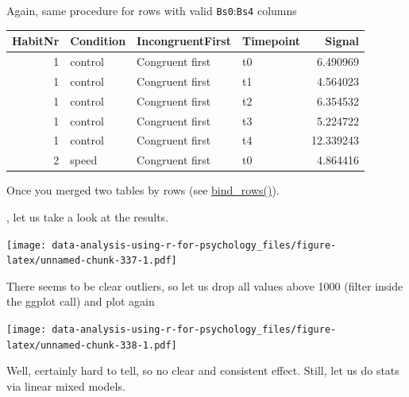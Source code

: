 \documentclass[
]{book}
\begin{document}
Again, same procedure for rows with valid \texttt{Bs0}:\texttt{Bs4} columns

\begin{tabular}{r|l|l|l|r}
\hline
HabitNr & Condition & IncongruentFirst & Timepoint & Signal\\
\hline
1 & control & Congruent first & t0 & 6.490969\\
\hline
1 & control & Congruent first & t1 & 4.564023\\
\hline
1 & control & Congruent first & t2 & 6.354532\\
\hline
1 & control & Congruent first & t3 & 5.224722\\
\hline
1 & control & Congruent first & t4 & 12.339243\\
\hline
2 & speed & Congruent first & t0 & 4.864416\\
\hline
\end{tabular}

Once you merged two tables by rows (see \href{https://dplyr.tidyverse.org/reference/bind.html}{bind\_rows()}).

, let us take a look at the results.

\texttt{[image: data-analysis-using-r-for-psychology\_files/figure-latex/unnamed-chunk-337-1.pdf]}

There seems to be clear outliers, so let us drop all values above 1000 (filter inside the ggplot call) and plot again

\texttt{[image: data-analysis-using-r-for-psychology\_files/figure-latex/unnamed-chunk-338-1.pdf]}

Well, certainly hard to tell, so no clear and consistent effect. Still, let us do stats via linear mixed models.
\end{document}
